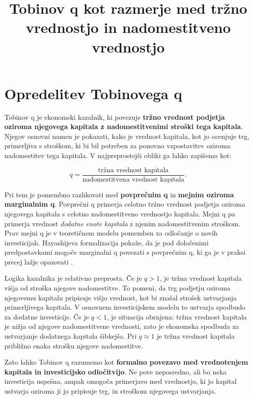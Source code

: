 \documentclass[12pt,a4paper]{article}
\title{\textbf{Tobinov q kot razmerje med tržno vrednostjo in nadomestitveno vrednostjo}}
\author{}
\date{}
\begin{document}
\maketitle

\section{Opredelitev Tobinovega q}

Tobinov q je ekonomski kazalnik, ki povezuje \textbf{tržno vrednost podjetja oziroma njegovega kapitala z nadomestitvenimi stroški tega kapitala}. Njegov osnovni namen je pokazati, kako je vrednost kapitala, kot jo ocenjuje trg, primerljiva s stroškom, ki bi bil potreben za ponovno vzpostavitev oziroma nadomestitev tega kapitala. V najpreprostejši obliki ga lahko zapišemo kot:

\begin{equation}
q =
\frac{\text{tržna vrednost kapitala}}
{\text{nadomestitvena vrednost kapitala}}.
\end{equation}

Pri tem je pomembno razlikovati med \textbf{povprečnim q} in \textbf{mejnim oziroma marginalnim q}. Povprečni q primerja celotno tržno vrednost podjetja oziroma njegovega kapitala s celotno nadomestitveno vrednostjo kapitala. Mejni q pa primerja vrednost \emph{dodatne enote kapitala} z njenim nadomestitvenim stroškom. Prav mejni q je v teoretičnem modelu pomemben za odločanje o novih investicijah. Hayashijeva formalizacija pokaže, da je pod določenimi predpostavkami mogoče marginalni q povezati s povprečnim q, ki ga je v praksi precej lažje opazovati \citep{AndreiMannMoyen2017,PetersTaylor2016}.

Logika kazalnika je relativno preprosta. Če je $q>1$, je tržna vrednost kapitala višja od stroška njegove nadomestitve. To pomeni, da trg podjetju oziroma njegovemu kapitalu pripisuje višjo vrednost, kot bi znašal strošek ustvarjanja primerljivega kapitala. V osnovnem investicijskem modelu to ustvarja spodbudo za dodatne investicije. Če je $q<1$, je situacija obrnjena: tržna vrednost kapitala je nižja od njegove nadomestitvene vrednosti, zato je ekonomska spodbuda za ustvarjanje dodatnega kapitala šibkejša. Pri $q \approx 1$ je tržna vrednost kapitala približno enaka strošku njegove nadomestitve.

Zato lahko Tobinov q razumemo kot \textbf{formalno povezavo med vrednotenjem kapitala in investicijsko odločitvijo}. Ne pove neposredno, ali bo neka investicija uspešna, ampak omogoča primerjavo med vrednostjo, ki jo kapital ustvarja oziroma ji jo pripisuje trg, in stroškom njegovega ustvarjanja.
\end{document}

